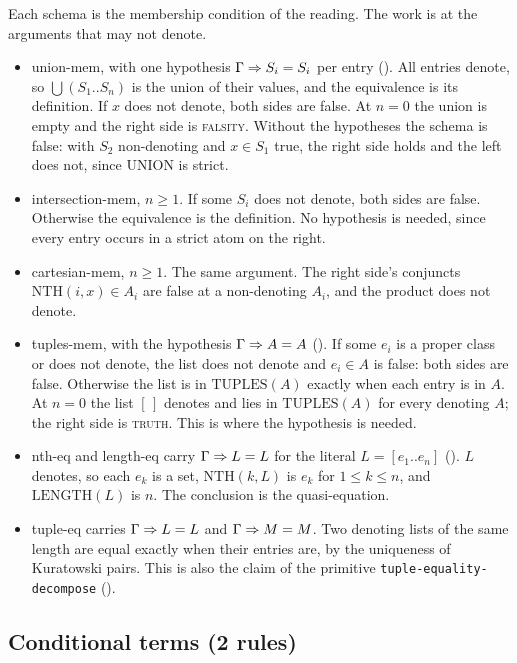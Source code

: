 Each schema is the membership condition of the reading.  The work is at
the arguments that may not denote.
\begin{itemize}
\item union-mem, with one hypothesis $\Gamma\Rightarrow S_i=S_i$ per entry
  ().  All entries denote, so $\bigcup(S_1..S_n)$ is the union of
  their values, and the equivalence is its definition.  If $x$ does not
  denote, both sides are false.  At $n=0$ the union is empty and the
  right side is \textsc{falsity}.  Without the hypotheses the schema is
  false: with $S_2$ non-denoting and $x\in S_1$ true, the right side holds
  and the left does not, since $\mathrm{UNION}$ is strict.
\item intersection-mem, $n\geq 1$.  If some $S_i$ does not denote, both
  sides are false.  Otherwise the equivalence is the definition.  No
  hypothesis is needed, since every entry occurs in a strict atom on the
  right.
\item cartesian-mem, $n\geq1$.  The same argument.  The right side's
  conjuncts $\mathrm{NTH}(i,x)\in A_i$ are false at a non-denoting
  $A_i$, and the product does not denote.
\item tuples-mem, with the hypothesis $\Gamma\Rightarrow A=A$ ().  If some
  $e_i$ is a proper class or does not denote, the list does not denote
  and $e_i\in A$ is false: both sides are false.  Otherwise the list is
  in $\mathrm{TUPLES}(A)$ exactly when each entry is in $A$.  At $n=0$
  the list $[\,]$ denotes and lies in $\mathrm{TUPLES}(A)$ for every
  denoting $A$; the right side is \textsc{truth}.  This is where the
  hypothesis is needed.
\item nth-eq and length-eq carry $\Gamma\Rightarrow L=L$ for the literal
  $L=[e_1..e_n]$ ().  $L$ denotes, so each $e_k$ is a set,
  $\mathrm{NTH}(k,L)$ is $e_k$ for $1\leq k\leq n$, and
  $\mathrm{LENGTH}(L)$ is $n$.  The conclusion is the quasi-equation.
\item tuple-eq carries $\Gamma\Rightarrow L=L$ and $\Gamma\Rightarrow M=M$.  Two
  denoting lists of the same length are equal exactly when their entries
  are, by the uniqueness of Kuratowski pairs.  This is also the claim of
  the primitive \texttt{tuple-equality-decompose} ().
\end{itemize}

\subsection{Conditional terms (2 rules)}

